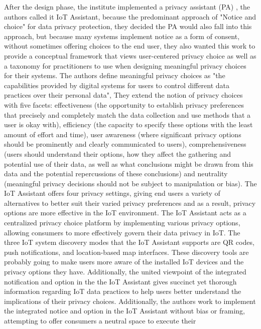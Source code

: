 \documentclass[conference]{IEEEtran}
\begin{document}
After the design phase, the institute implemented a privacy assistant (PA) \cite{FengDesign},
the authors called it IoT Assistant, because the predominant approach of
"Notice and choice" for data privacy protection, they decided the PA would
also fall into this approach, but because many systems implement notice as
a form of consent, without sometimes offering choices to the end user, they
also wanted this work to provide a conceptual framework that views user-centered
privacy choice as well as a taxonomy for practitioners to use when designing
meaningful privacy choices for their systems. The authors define meaningful
privacy choices as "the capabilities provided by digital systems for users to
control different data practices over their personal data", They extend the
notion of privacy choices with five facets: effectiveness (the opportunity
to establish privacy preferences that precisely and completely match the data
collection and use methods that a user is okay with), efficiency (the capacity
to specify these options with the least amount of effort and time), user awareness
(where significant privacy options should be prominently and clearly communicated
to users), comprehensiveness (users should understand their options, how they
affect the gathering and potential use of their data, as well as what conclusions
might be drawn from this data and the potential repercussions of these conclusions)
and neutrality (meaningful privacy decisions should not be subject to manipulation
or bias). The IoT Assistant offers four privacy settings, giving end users a
variety of alternatives to better suit their varied privacy preferences and
as a result, privacy options are more effective in the IoT environment. The
IoT Assistant acts as a centralized privacy choice platform by implementing
various privacy options, allowing consumers to more effectively govern their
data privacy in IoT. The three IoT system discovery modes that the IoT Assistant
supports are QR codes, push notifications, and location-based map interfaces.
These discovery tools are probably going to make users more aware of the installed
IoT devices and the privacy options they have. Additionally, the united viewpoint
of the integrated notification and option in the the IoT Assistant gives succinct
yet thorough information regarding IoT data practices to help users better
understand the implications of their privacy choices. Additionally, the authors
work to implement the integrated notice and option in the IoT Assistant without
bias or framing, attempting to offer consumers a neutral space to execute their
\end{document}
